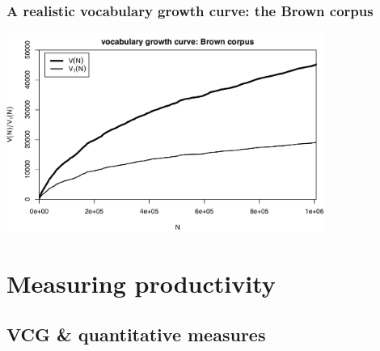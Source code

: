 \documentclass[handout,notes=show,t]{beamer} %
\begin{document}
\begin{frame}
  \frametitle{A realistic vocabulary growth curve: the Brown corpus}

  \ungap[1]
  \begin{center}
    \includegraphics[height=6.5cm]{../plots/tutorial_brown_vgc}%
  \end{center}
\end{frame}

\section{Measuring productivity}

\subsection{VCG \& quantitative measures}
\end{document}
